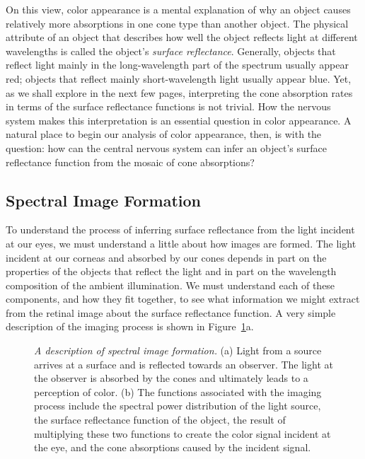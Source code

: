 On this view, color appearance is a mental explanation of why an
object causes relatively more absorptions in one cone type than
another object.  The physical attribute of an object that describes
how well the object reflects light at different wavelengths is called
the object's {\em surface reflectance}.  Generally, objects that
reflect light mainly in the long-wavelength part of the spectrum
usually appear red; objects that reflect mainly short-wavelength light
usually appear blue.  Yet, as we shall explore in the next few pages,
interpreting the cone absorption rates in terms of the surface
reflectance functions is not trivial.  How the nervous system makes
this interpretation is an essential question in color appearance. A
natural place to begin our analysis of color appearance, then, is with
the question: how can the central nervous system can infer an object's
surface reflectance function from the mosaic of cone absorptions?

\subsection*{Spectral Image Formation}
To understand the process of inferring surface reflectance from the
light incident at our eyes, we must understand a little about how
images are formed.  The light incident at our corneas and absorbed by
our cones depends in part on the properties of the objects that
reflect the light and in part on the wavelength composition of the
ambient illumination.  We must understand each of these components,
and how they fit together, to see what information we might extract
from the retinal image about the surface reflectance function.  A very
simple description of the imaging process is shown in
Figure~\ref{f8:imaging}a.
\begin{figure}
\centerline{
}
\caption[The color imaging process]{
{\em A description of spectral image formation.}  (a) Light from a
source arrives at a surface and is reflected towards an observer.  The
light at the observer is absorbed by the cones and ultimately leads to
a perception of color.  (b) The functions associated with the imaging
process include the spectral power distribution of the light source,
the surface reflectance function of the object, the result of
multiplying these two functions to create the color signal incident at
the eye, and the cone absorptions caused by the incident signal.  }
\label{f8:imaging}
\end{figure}

